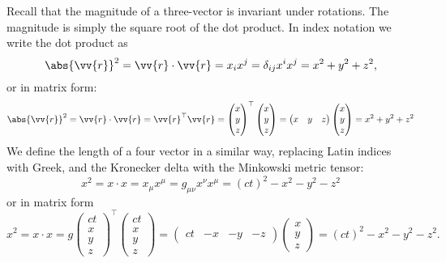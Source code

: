 \documentclass[fleqn]{NotesClass}
\newcommand*{\trans}{\top}
\begin{document}
    Recall that the magnitude of a three-vector is invariant under rotations.
    The magnitude is simply the square root of the dot product.
    In index notation we write the dot product as
    \begin{equation}
        \abs{\vv{r}}^2 = \vv{r} \cdot \vv{r} = x_ix^j = \delta_{ij}x^ix^j = x^2 + y^2 + z^2,
    \end{equation}
    or in matrix form:
    \begin{equation}
        \abs{\vv{r}}^2 = \vv{r} \cdot \vv{r} = \vv{r}^\trans\vv{r} = 
        \begin{pmatrix}
            x\\ y\\ z
        \end{pmatrix}
        ^\trans
        \begin{pmatrix}
            x\\ y\\ z
        \end{pmatrix}
        =
        \begin{pmatrix}
            x & y & z
        \end{pmatrix}
        \begin{pmatrix}
            x\\ y\\ z
        \end{pmatrix}
        = x^2 + y^2 + z^2
    \end{equation}
    We define the length of a four vector in a similar way, replacing Latin indices with Greek, and the Kronecker delta with the Minkowski metric tensor:
    \begin{equation}
        x^2 = x\cdot x = x_\mu x^\mu = g_{\mu\nu} x^\nu x^\mu = (ct)^2 - x^2 - y^2 - z^2
    \end{equation}
    or in matrix form
    \begin{equation}
        x^2 = x\cdot x = g
        \begin{pmatrix}
            ct\\ x\\ y\\ z
        \end{pmatrix}
        ^\trans
        \begin{pmatrix}
            ct\\ x\\ y\\ z
        \end{pmatrix}
        =
        \begin{pmatrix}
            ct & -x & -y & -z
        \end{pmatrix}
        \begin{pmatrix}
            x\\ y\\ z
        \end{pmatrix}
        = (ct)^2 - x^2 - y^2 - z^2.
    \end{equation}
\end{document}
